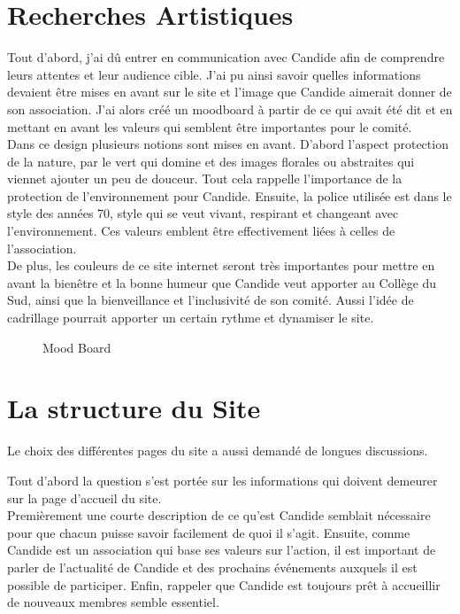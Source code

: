 \documentclass[a4,10pt,french]{sphinxmanual}
\begin{document}
\section{Recherches Artistiques}
\label{\detokenize{chapitre-02:recherches-artistiques}}
\sphinxAtStartPar
Tout d’abord, j’ai dû entrer en communication avec Candide afin de comprendre leurs attentes et leur audience cible. J’ai pu ainsi savoir quelles informations devaient être mises en avant sur le site et l’image que Candide aimerait donner de son association. J’ai alors créé un moodboard à partir de ce qui avait été dit et en mettant en avant les valeurs qui semblent être importantes pour le comité.\\
Dans ce design plusieurs notions sont mises en avant. D’abord l’aspect protection de la nature, par le vert qui domine et des images florales ou abstraites qui viennet ajouter un peu de douceur. Tout cela rappelle l’importance de la protection de l’environnement pour Candide.
Ensuite, la police utilisée est dans le style des années 70, style qui se veut vivant, respirant et changeant avec l’environnement. Ces valeurs emblent être effectivement liées à celles de l’association.\\
De plus, les couleurs de ce site internet seront très importantes pour mettre en avant la bien\sphinxhyphen{}être et la bonne humeur que Candide veut apporter au Collège du Sud, ainsi que la bienveillance et l’inclusivité de son comité. Aussi l’idée de cadrillage pourrait apporter un certain rythme et dynamiser le site.

\begin{figure}[htbp]
\centering
\capstart

\noindent{}
\caption{Mood Board}\label{\detokenize{chapitre-02:id1}}\end{figure}


\section{La structure du Site}
\label{\detokenize{chapitre-02:la-structure-du-site}}
\sphinxAtStartPar
Le choix des différentes pages du site a aussi demandé de longues discussions.

\sphinxAtStartPar
Tout d’abord la question s’est portée sur les informations qui doivent demeurer sur la page d’accueil du site.\\
Premièrement une courte description de ce qu’est Candide semblait nécessaire pour que chacun puisse savoir facilement de quoi il s’agit. Ensuite, comme Candide est un association qui base ses valeurs sur l’action, il est important de parler de l’actualité de Candide et des prochains événements auxquels il est possible de participer. Enfin, rappeler que Candide est toujours prêt à accueillir de nouveaux membres semble essentiel.
\end{document}
